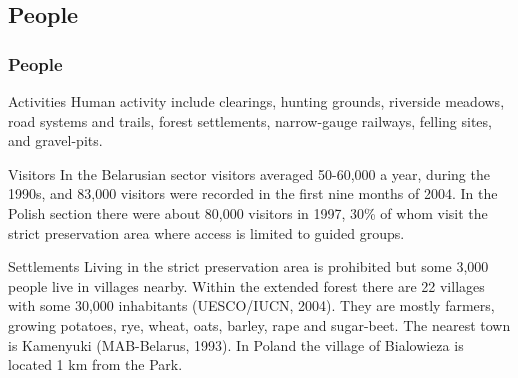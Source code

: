 \documentclass[pdflatex,compress,8pt,
	xcolor={dvipsnames,dvipsnames,svgnames,x11names,table},
	hyperref={colorlinks = true,
	breaklinks = true, urlcolor = NavyBlue, breaklinks = true}]{beamer}
\begin{document}
\subsection{People}
\begin{frame}\frametitle{People}

\begin{alertblock}{Activities}
Human activity include clearings, hunting grounds, riverside meadows, road systems and trails, forest settlements, narrow-gauge railways, felling sites, and gravel-pits.
\end{alertblock}

\begin{examples}{Visitors}
In the Belarusian sector visitors averaged 50-60,000 a year, during the 1990s, and 83,000 visitors were recorded in the first nine months of 2004.
In the Polish section there were about 80,000 visitors in 1997, 30\% of whom visit the strict preservation area where access is limited to guided groups. 
\end{examples}

\begin{block}{Settlements}
Living in the strict preservation area is prohibited but some 3,000 people live in villages nearby. Within the extended forest there are 22 villages with some 30,000 inhabitants (UESCO/IUCN, 2004). They are mostly farmers, growing potatoes, rye, wheat, oats, barley, rape and sugar-beet. The nearest town is Kamenyuki (MAB-Belarus, 1993). In Poland the village of Bialowieza is located 1 km from the Park.
\end{block}

\end{frame}
\end{document}
